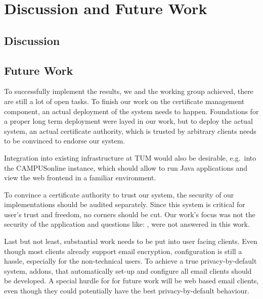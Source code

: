 \chapter{Discussion and Future Work}\label{ch:futureWork}

\section*{Discussion}

\section*{Future Work}
To successfully implement the results, we and the working group  achieved, there are still a lot of
open tasks.
To finish our work on the certificate management component, an actual deployment of the system needs to happen.
Foundations for a proper long term deployment were layed in our work, but to deploy the actual system,
an actual certificate authority, which is trusted by arbitrary clients needs to be convinced to endorse our system.

Integration into existing infrastructure at TUM would also be desirable, e.g.\ into the CAMPUSonline instance, which
should allow to run Java applications and view the web frontend in a familiar environment.

To convince a certificate authority to trust our system, the security of our implementations should be audited
separately.
Since this system is critical for user's trust and freedom, no corners should be cut.
Our work's focus was not the security of the application and questions like: , were not answered in this work.

Last but not least, substantial work needs to be put into user facing clients.
Even though most clients already support email encryption, configuration is still a hassle, especially for the
non-technical users.
To achieve a true privacy-by-default system, addons, that automatically set-up and configure all email clients should be
developed.
A special hurdle for for future work will be web based email clients, even though they could potentially have the best
privacy-by-default behaviour.
